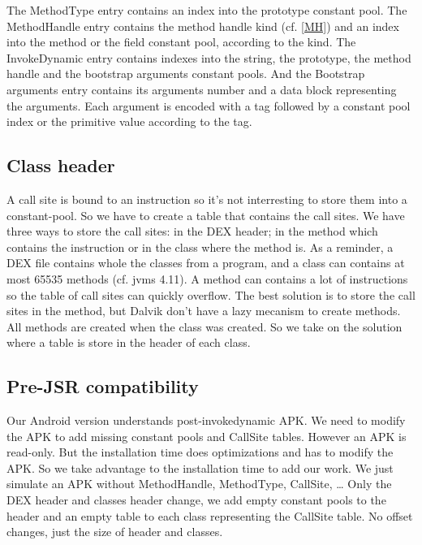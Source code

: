 \documentclass{sigplanconf}
\def \ANDROID{\mbox{Android}\xspace}
\begin{document}
    The MethodType entry contains an index into the prototype constant pool.
    The MethodHandle entry contains the method handle kind (cf. \ref{MH})
    and an index into the method or the field constant pool, according to the kind.
    The InvokeDynamic entry contains indexes into the string, the prototype,
    the method handle and the bootstrap arguments constant pools.
    And the Bootstrap arguments entry contains its arguments number
    and a data block representing the arguments.
    Each argument is encoded with a tag
    followed by a constant pool index or the primitive value according to the tag.


      
      
      
      

  \subsection{Class header}

    A call site is bound to an instruction so it's not interresting to store them into a constant-pool.
    So we have to create a table that contains the call sites.
    We have three ways to store the call sites: in the DEX header; in the method which contains the instruction or in the class where the method is.
    As a reminder, a DEX file contains whole the classes from a program, and a class can contains at most 65535 methods (cf. jvms 4.11).
    A method can contains a lot of instructions so the table of call sites can quickly overflow.
    The best solution is to store the call sites in the method, but Dalvik don't have a lazy mecanism to create methods.
    All methods are created when the class was created.
    So we take on the solution where a table is store in the header of each class.

  \subsection{Pre-JSR compatibility}
    Our \ANDROID version understands post-invokedynamic APK.
    We need to modify the APK to add missing constant pools and CallSite tables.
    However an APK is read-only.
    But the installation time does optimizations and has to modify the APK.
    So we take advantage to the installation time to add our work.
    We just simulate an APK without MethodHandle, MethodType, CallSite, \dots
    Only the DEX header and classes header change, we add empty constant pools to the header
    and an empty table to each class representing the CallSite table.
    No offset changes, just the size of header and classes.
\end{document}
